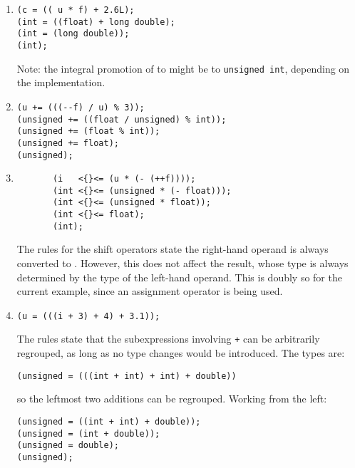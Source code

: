    \begin{enumerate}

    \item 
     \begin{Verbatim}
(c = (( u * f) + 2.6L);
(int = ((float) + long double);
(int = (long double));
(int);
\end{Verbatim}

     Note: the integral promotion of \kchar{} to \kint{}
      might be to \texttt{unsigned int}, depending on the
      implementation.


    

    \item 
     \begin{Verbatim}
(u += (((--f) / u) % 3));
(unsigned += ((float / unsigned) % int));
(unsigned += (float % int));
(unsigned += float);
(unsigned);
\end{Verbatim}

    

    \item 
     \begin{Verbatim}
       (i   <{}<= (u * (- (++f))));
       (int <{}<= (unsigned * (- float)));
       (int <{}<= (unsigned * float));
       (int <{}<= float);
       (int);
     \end{Verbatim}

     The rules for the shift operators state the right-hand operand is
      always converted to \kint. However, this does not affect the
      result, whose type is always determined by the type of the left-hand
      operand. This is doubly so for the current example, since an assignment
      operator is being used.


    

    \item 
     \begin{Verbatim}
(u = (((i + 3) + 4) + 3.1));
\end{Verbatim}

     The rules state that the subexpressions involving \texttt{+} can be
      arbitrarily regrouped, as long as no type changes would be introduced.
      The types are:


     \begin{Verbatim}
(unsigned = (((int + int) + int) + double))
\end{Verbatim}

     so the leftmost two additions can be regrouped. Working from the
      left:


     \begin{Verbatim}
(unsigned = ((int + int) + double));
(unsigned = (int + double));
(unsigned = double);
(unsigned);
\end{Verbatim}


\end{enumerate}
